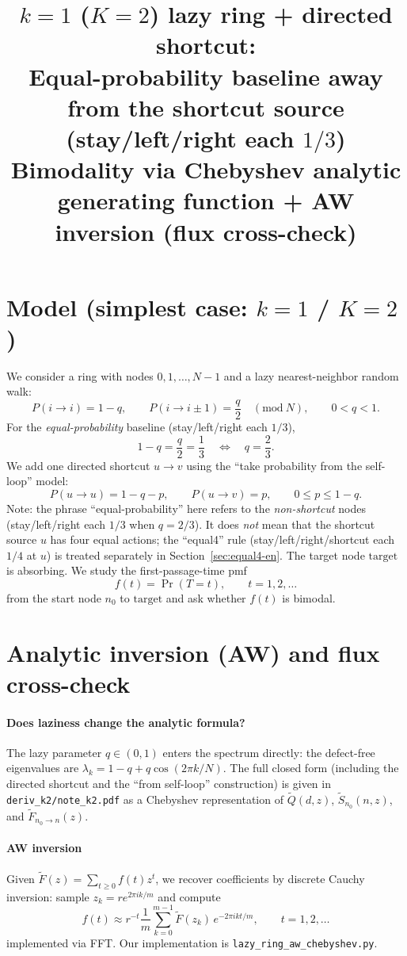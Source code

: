 \documentclass[11pt]{article}
\title{$k=1$ ($K=2$) lazy ring + directed shortcut:\\Equal-probability baseline away from the shortcut source (stay/left/right each $1/3$)\\Bimodality via Chebyshev analytic generating function + AW inversion (flux cross-check)}
\author{}
\date{}
\begin{document}
\sloppy
\maketitle

\section{Model (simplest case: $k=1$ / $K=2$)}
We consider a ring with nodes $0,1,\dots,N-1$ and a lazy nearest-neighbor random walk:
\[
P(i\to i)=1-q,\qquad P(i\to i\pm1)=\frac{q}{2}\quad(\mathrm{mod}\ N),
\qquad 0<q<1.
\]
For the \emph{equal-probability} baseline (stay/left/right each $1/3$),
\[
1-q=\frac{q}{2}=\frac{1}{3}\quad\Longleftrightarrow\quad q=\frac{2}{3}.
\]
We add one directed shortcut $u\to v$ using the ``take probability from the self-loop'' model:
\[
P(u\to u)=1-q-p,\qquad P(u\to v)=p,\qquad 0\le p\le 1-q.
\]
Note: the phrase “equal-probability” here refers to the \emph{non-shortcut} nodes (stay/left/right each $1/3$ when $q=2/3$).
It does \emph{not} mean that the shortcut source $u$ has four equal actions; the “equal4” rule (stay/left/right/shortcut each $1/4$ at $u$)
is treated separately in Section~\ref{sec:equal4-en}.
The target node $\mathrm{target}$ is absorbing. We study the first-passage-time pmf
\[
f(t)=\Pr(T=t),\qquad t=1,2,\dots
\]
from the start node $n_0$ to $\mathrm{target}$ and ask whether $f(t)$ is bimodal.

\section{Analytic inversion (AW) and flux cross-check}
\paragraph{Does laziness change the analytic formula?}
The lazy parameter $q\in(0,1)$ enters the spectrum directly: the defect-free eigenvalues are
$\lambda_k=1-q+q\cos(2\pi k/N)$.
The full closed form (including the directed shortcut and the ``from self-loop'' construction) is given in
\texttt{deriv\_k2/note\_k2.pdf}
as a Chebyshev representation of $\tilde Q(d,z)$, $\tilde S_{n_0}(n,z)$, and $\tilde F_{n_0\to n}(z)$.

\paragraph{AW inversion}
Given $\tilde F(z)=\sum_{t\ge0} f(t)z^t$, we recover coefficients by discrete Cauchy inversion:
sample $z_k=r e^{2\pi i k/m}$ and compute
\[
f(t)\approx r^{-t}\frac{1}{m}\sum_{k=0}^{m-1}\tilde F(z_k)\,e^{-2\pi i k t/m},
\qquad t=1,2,\dots
\]
implemented via FFT. Our implementation is \texttt{lazy\_ring\_aw\_chebyshev.py}.
\end{document}
